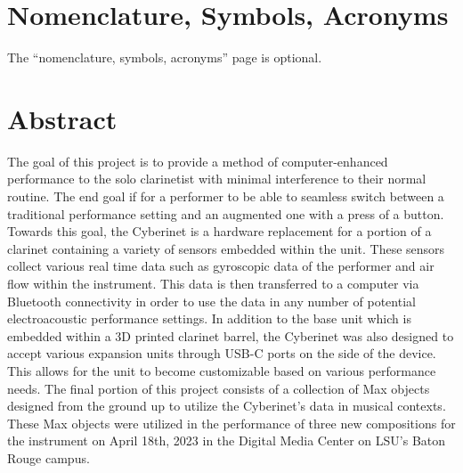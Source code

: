 \tableofcontents






\chapter{Nomenclature, Symbols, Acronyms}

The ``nomenclature, symbols, acronyms'' page is optional.


\chapter{Abstract}


The goal of this project is to provide a method of computer-enhanced performance to the solo clarinetist with minimal interference to their normal routine. The end goal if for a performer to be able to seamless switch between a traditional performance setting and an augmented one with a press of a button. Towards this goal, the Cyberinet is a hardware replacement for a portion of a clarinet containing a variety of sensors embedded within the unit. These sensors collect various real time data such as gyroscopic data of the performer and air flow within the instrument. This data is then transferred to a computer via Bluetooth connectivity in order to use the data in any number of potential electroacoustic performance settings. In addition to the base unit which is embedded within a 3D printed clarinet barrel, the Cyberinet was also designed to accept various expansion units through USB-C ports on the side of the device. This allows for the unit to become customizable based on various performance needs. The final portion of this project consists of a collection of Max objects designed from the ground up to utilize the Cyberinet’s data in musical contexts. These Max objects were utilized in the performance of three new compositions for the instrument on April 18th, 2023 in the Digital Media Center on LSU’s Baton Rouge campus.

\mainmatter


